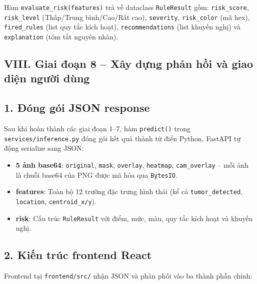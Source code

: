 \begin{sloppypar}
Hàm \texttt{evaluate\_risk(features)} trả về dataclass \texttt{RuleResult} gồm: \texttt{risk\_score}, \texttt{risk\_level} (Thấp/Trung bình/Cao/Rất cao), \texttt{severity}, \texttt{risk\_color} (mã hex), \texttt{fired\_rules} (list quy tắc kích hoạt), \texttt{recommendations} (list khuyến nghị) và \texttt{explanation} (tóm tắt nguyên nhân).
\end{sloppypar}

\subsection*{VIII. Giai đoạn 8 -- Xây dựng phản hồi và giao diện người dùng}

\subsection*{1. Đóng gói JSON response}

Sau khi hoàn thành các giai đoạn 1--7, hàm \texttt{predict()} trong \texttt{services/inference.py} đóng gói kết quả thành từ điển Python, FastAPI tự động serialize sang JSON:

\begin{itemize}
    \item \textbf{5 ảnh base64}: \texttt{original}, \texttt{mask}, \texttt{overlay}, \texttt{heatmap}, \texttt{cam\_overlay} -- mỗi ảnh là chuỗi base64 của PNG được mã hóa qua \texttt{BytesIO}.
    \item \textbf{features}: Toàn bộ 12 trường đặc trưng hình thái (kể cả \texttt{tumor\_detected}, \texttt{location}, \texttt{centroid\_x/y}).
    \item \textbf{risk}: Cấu trúc \texttt{RuleResult} với điểm, mức, màu, quy tắc kích hoạt và khuyến nghị.
\end{itemize}

\subsection*{2. Kiến trúc frontend React}

Frontend tại \texttt{frontend/src/} nhận JSON và phân phối vào ba thành phần chính:


